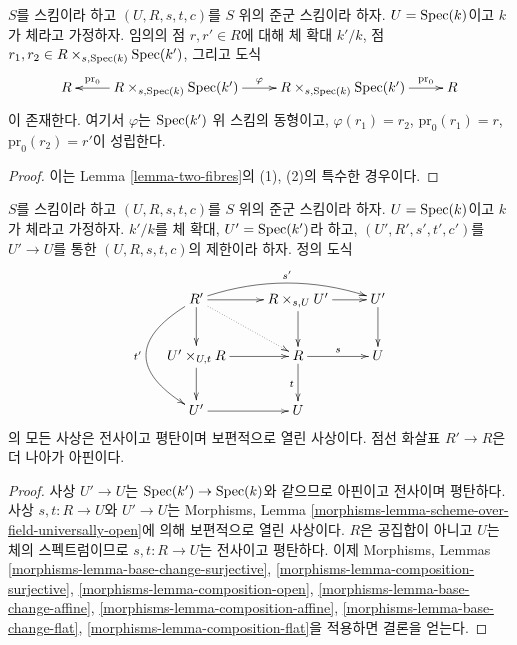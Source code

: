 \begin{lemma}
\label{lemma-groupoid-on-field-homogeneous}
$S$를 스킴이라 하고 $(U, R, s, t, c)$를 $S$ 위의 준군 스킴이라 하자.
$U = \mathop{\mathrm{Spec}}(k)$이고 $k$가 체라고 가정하자. 임의의 점
$r, r' \in R$에 대해 체 확대 $k'/k$, 점
$r_1, r_2 \in R \times_{s, \mathop{\mathrm{Spec}}(k)} \mathop{\mathrm{Spec}}(k')$, 그리고 도식
$$
\xymatrix{
R &
R \times_{s, \Spec(k)} \Spec(k')
\ar[l]_-{\text{pr}_0} \ar[r]^\varphi &
R \times_{s, \Spec(k)} \Spec(k')
\ar[r]^-{\text{pr}_0} &
R
}
$$
이 존재한다. 여기서 $\varphi$는 $\mathop{\mathrm{Spec}}(k')$ 위 스킴의 동형이고,
$\varphi(r_1) = r_2$, $\text{pr}_0(r_1) = r$,
$\text{pr}_0(r_2) = r'$이 성립한다.
\end{lemma}

\begin{proof}
이는 Lemma \ref{lemma-two-fibres}의 (1), (2)의 특수한 경우이다.
\end{proof}

\begin{lemma}
\label{lemma-restrict-groupoid-on-field}
$S$를 스킴이라 하고 $(U, R, s, t, c)$를 $S$ 위의 준군 스킴이라 하자.
$U = \mathop{\mathrm{Spec}}(k)$이고 $k$가 체라고 가정하자. $k'/k$를 체 확대,
$U' = \mathop{\mathrm{Spec}}(k')$라 하고, $(U', R', s', t', c')$를
$U' \to U$를 통한 $(U, R, s, t, c)$의 제한이라 하자. 정의 도식
$$
\xymatrix{
R' \ar[d] \ar[r] \ar@/_3pc/[dd]_{t'} \ar@/^1pc/[rr]^{s'} \ar@{..>}[rd] &
R \times_{s, U} U' \ar[r] \ar[d] &
U' \ar[d] \\
U' \times_{U, t} R \ar[d] \ar[r] &
R \ar[r]^s \ar[d]_t &
U \\
U' \ar[r] &
U
}
$$
의 모든 사상은 전사이고 평탄이며 보편적으로 열린 사상이다.
점선 화살표 $R' \to R$은 더 나아가 아핀이다.
\end{lemma}

\begin{proof}
사상 $U' \to U$는 $\mathop{\mathrm{Spec}}(k') \to \mathop{\mathrm{Spec}}(k)$와 같으므로 아핀이고
전사이며 평탄하다. 사상 $s, t : R \to U$와 $U' \to U$는
Morphisms, Lemma \ref{morphisms-lemma-scheme-over-field-universally-open}에 의해
보편적으로 열린 사상이다. $R$은 공집합이 아니고 $U$는 체의 스펙트럼이므로
$s, t : R \to U$는 전사이고 평탄하다. 이제 Morphisms, Lemmas
\ref{morphisms-lemma-base-change-surjective},
\ref{morphisms-lemma-composition-surjective},
\ref{morphisms-lemma-composition-open},
\ref{morphisms-lemma-base-change-affine},
\ref{morphisms-lemma-composition-affine},
\ref{morphisms-lemma-base-change-flat},
\ref{morphisms-lemma-composition-flat}을 적용하면 결론을 얻는다.
\end{proof}

